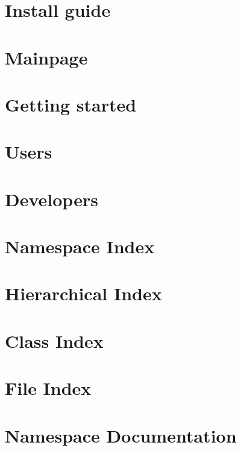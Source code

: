 \let\mypdfximage\pdfximage\def\pdfximage{\immediate\mypdfximage}\documentclass[twoside]{book}
\newcommand{\+}{\discretionary{\mbox{\scriptsize$\hookleftarrow$}}{}{}}
\begin{document}
\chapter{Install guide}
\label{md_docs_markdown_install_guide}

\chapter{Mainpage}
\label{md_docs_markdown_mainpage}

\chapter{Getting started}
\label{getting_started}

\chapter{Users}
\label{page_users}

\chapter{Developers}
\label{page_developers}

\chapter{Namespace Index}

\chapter{Hierarchical Index}

\chapter{Class Index}

\chapter{File Index}

\chapter{Namespace Documentation}












\end{document}

